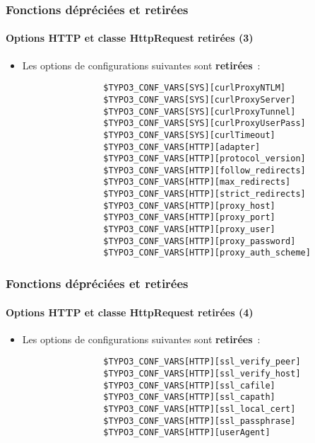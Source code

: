 \begin{frame}[fragile]
	\frametitle{Fonctions dépréciées et retirées}
	\framesubtitle{Options HTTP et classe HttpRequest retirées (3)}

	\begin{itemize}

		\item Les options de configurations suivantes sont \textbf{retirées}~:
			\begin{lstlisting}
				$TYPO3_CONF_VARS[SYS][curlProxyNTLM]
				$TYPO3_CONF_VARS[SYS][curlProxyServer]
				$TYPO3_CONF_VARS[SYS][curlProxyTunnel]
				$TYPO3_CONF_VARS[SYS][curlProxyUserPass]
				$TYPO3_CONF_VARS[SYS][curlTimeout]
				$TYPO3_CONF_VARS[HTTP][adapter]
				$TYPO3_CONF_VARS[HTTP][protocol_version]
				$TYPO3_CONF_VARS[HTTP][follow_redirects]
				$TYPO3_CONF_VARS[HTTP][max_redirects]
				$TYPO3_CONF_VARS[HTTP][strict_redirects]
				$TYPO3_CONF_VARS[HTTP][proxy_host]
				$TYPO3_CONF_VARS[HTTP][proxy_port]
				$TYPO3_CONF_VARS[HTTP][proxy_user]
				$TYPO3_CONF_VARS[HTTP][proxy_password]
				$TYPO3_CONF_VARS[HTTP][proxy_auth_scheme]
			\end{lstlisting}
	\end{itemize}

\end{frame}


\begin{frame}[fragile]
	\frametitle{Fonctions dépréciées et retirées}
	\framesubtitle{Options HTTP et classe HttpRequest retirées (4)}

	\begin{itemize}

		\item Les options de configurations suivantes sont \textbf{retirées}~:
			\begin{lstlisting}
				$TYPO3_CONF_VARS[HTTP][ssl_verify_peer]
				$TYPO3_CONF_VARS[HTTP][ssl_verify_host]
				$TYPO3_CONF_VARS[HTTP][ssl_cafile]
				$TYPO3_CONF_VARS[HTTP][ssl_capath]
				$TYPO3_CONF_VARS[HTTP][ssl_local_cert]
				$TYPO3_CONF_VARS[HTTP][ssl_passphrase]
				$TYPO3_CONF_VARS[HTTP][userAgent]
			\end{lstlisting}
	\end{itemize}

\end{frame}

